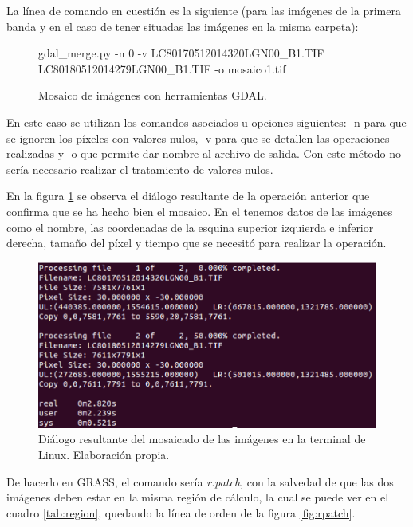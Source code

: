 La línea de comando en cuestión es la siguiente (para las imágenes de la primera banda y en el caso de tener situadas las imágenes en la misma carpeta):

\begin{figure}[ht]
\centering
\begin{boxedverbatim}
	gdal_merge.py -n 0 -v LC80170512014320LGN00_B1.TIF 
	LC80180512014279LGN00_B1.TIF -o mosaico1.tif
\end{boxedverbatim}
\caption[Mosaico de imágenes]{Mosaico de imágenes con herramientas GDAL.}
\end{figure}

En este caso se utilizan los comandos asociados u opciones siguientes: -n para que se ignoren los píxeles con valores nulos, -v para que se detallen las operaciones realizadas y -o que permite dar nombre al archivo de salida. Con este método no sería necesario realizar el tratamiento de valores nulos.\Sep

En la figura \ref{fig:dialogomosaico} se observa el diálogo resultante de la operación anterior que confirma que se ha hecho bien el mosaico. En el tenemos datos de las imágenes como el nombre, las coordenadas de la esquina superior izquierda e inferior derecha, tamaño del píxel y tiempo que se necesitó para realizar la operación.\Sep

\begin{figure}
	\centering
	\includegraphics[width=0.8\linewidth]{./Imagenes/Dialogo_mosaico.eps}
	\caption[Diálogo del mosaicado]{Diálogo resultante del mosaicado de las imágenes en la terminal de Linux. Elaboración propia.}
	\label{fig:dialogomosaico}
\end{figure}

De hacerlo en GRASS, el comando sería \textit{r.patch}, con la salvedad de que las dos imágenes deben estar en la misma región de cálculo, la cual se puede ver en el cuadro \ref{tab:region}, quedando la línea de orden de la figura \ref{fig:rpatch}.

